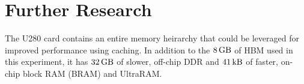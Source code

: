 \section{Further Research}

The U280 card contains an entire memory heirarchy that could be leveraged for improved performance using caching. In addition to the $\SI{8}{\giga\byte}$ of HBM used in this experiment, it has $\SI{32}{\giga\byte}$ of slower, off-chip DDR and $\SI{41}{\kilo\byte}$ of faster, on-chip block RAM (BRAM) and UltraRAM.
